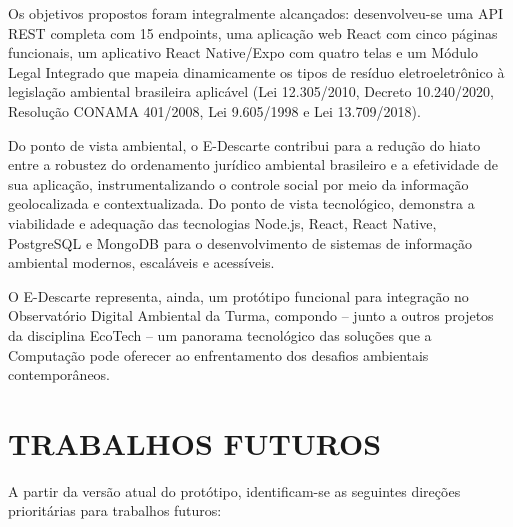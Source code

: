 \documentclass[12pt, a4paper]{article}
\numberwithin{equation}{section}
\numberwithin{figure}{section}
\numberwithin{table}{section}
\begin{document}
Os objetivos propostos foram integralmente alcançados: desenvolveu-se uma API
REST completa com 15 endpoints, uma aplicação web React com cinco páginas
funcionais, um aplicativo React Native/Expo com quatro telas e um Módulo Legal
Integrado que mapeia dinamicamente os tipos de resíduo eletroeletrônico à
legislação ambiental brasileira aplicável (Lei 12.305/2010, Decreto 10.240/2020,
Resolução CONAMA 401/2008, Lei 9.605/1998 e Lei 13.709/2018).

Do ponto de vista ambiental, o E-Descarte contribui para a redução do hiato
entre a robustez do ordenamento jurídico ambiental brasileiro e a efetividade
de sua aplicação, instrumentalizando o controle social por meio da informação
geolocalizada e contextualizada. Do ponto de vista tecnológico, demonstra a
viabilidade e adequação das tecnologias Node.js, React, React Native, PostgreSQL
e MongoDB para o desenvolvimento de sistemas de informação ambiental modernos,
escaláveis e acessíveis.

O E-Descarte representa, ainda, um protótipo funcional para integração no
Observatório Digital Ambiental da Turma, compondo -- junto a outros projetos
da disciplina EcoTech -- um panorama tecnológico das soluções que a Computação
pode oferecer ao enfrentamento dos desafios ambientais contemporâneos.

\section{TRABALHOS FUTUROS}

A partir da versão atual do protótipo, identificam-se as seguintes direções
prioritárias para trabalhos futuros:
\end{document}
